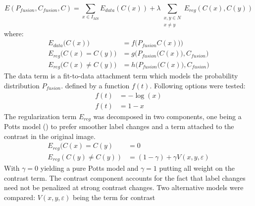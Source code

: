 \documentclass[10pt]{article}
\begin{document}
\[E(P_{fusion},C_{fusion},C)=\sum_{x\in I_{MS}}E_{data}(C(x))+\lambda\sum _{\substack{x,y\in N\\x\neq y}}E_{reg}(C(x),C(y)) \]
where:
\begin{align}
E_{data}\big(C(x)\big)&=f\Big(P_{fusion}C(x)\big)\Big)\\
E_{reg}\big(C(x)=C(y)\big)&=g\Big(P_{fusion}\big(C(x)\big),C_{fusion}\Big)\\
E_{reg}\big(C(x)\neq C(y)\big)&=h\Big(P_{fusion}\big(C(x)\big),C_{fusion}\Big)
\end{align}
The data term is a fit-to-data attachment term which models the probability distribution $P_{fusion}$. defined by a function $f(t)$. Following options were tested:
\begin{align}
f(t)&=-\log(x)\\
f(t)&=1-x
\end{align}
The regularization term $E_{reg}$ was decomposed in two components, one being a Potts model (\cite{schindler_overview_2012}) to prefer smoother label changes and a term attached to the contrast in the original image.
\begin{align}
    E_{reg}(C(x)=C(y)&=0\\ 
    E_{reg}(C(y)\neq C(y))&=(1-\gamma)+\gamma V(x,y,\varepsilon)
\end{align}
With $\gamma = 0$ yielding a pure Potts model and $\gamma = 1$ putting all weight on the contrast term. The contrast component accounts for the fact that label changes need not be penalized at strong contrast changes. Two alternative models were compared:
$V(x,y,\varepsilon)$ being the term for contrast
\end{document}
